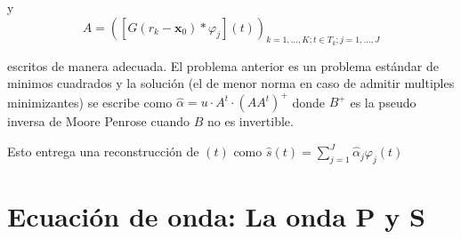 y
$$A=\left(\left[G\left(r_{k}-\mathbf{x}_{0}\right)\ast\varphi_{j}\right]\left(t\right)\right)_{k=1,\ldots,K;t\in
T_{k};j=1,\ldots,J}$$
 

escritos de manera adecuada. El problema anterior es un problema estándar de
minimos cuadrados  y la solución (el de menor norma en caso de admitir multiples
minimizantes)  se escribe como $\hat{\alpha}=u\cdot
A^{t}\cdot\left(AA^{t}\right)^{+}$ donde $B^{+}$ es la pseudo inversa de Moore
Penrose cuando $B$ no es invertible.

Esto entrega una reconstrucción de $\left(t\right)$ como
$\hat{s}\left(t\right)=\sum_{j=1}^{J}\hat{\alpha}_{j}\varphi_{j}\left(t\right)$
 



\section{Ecuación de onda: La onda P y S}



